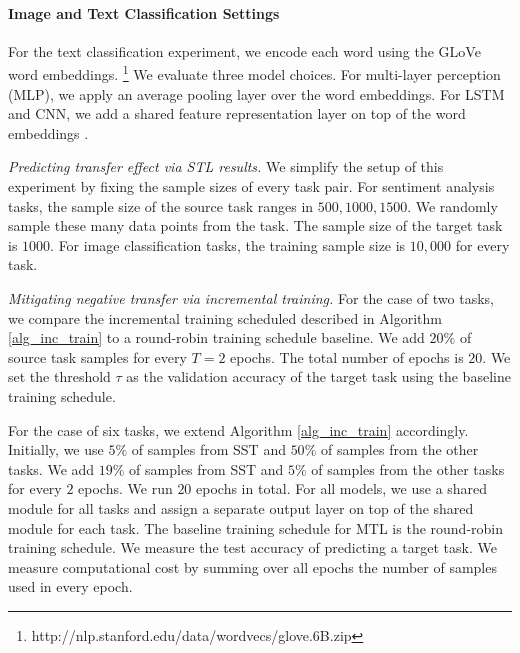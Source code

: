 \paragraph{Image and Text Classification Settings}\label{app_it}

For the text classification experiment, we encode each word using the GLoVe word embeddings.%
\footnote{http://nlp.stanford.edu/data/wordvecs/glove.6B.zip}
We evaluate three model choices.
For multi-layer perception (MLP), we apply an average pooling layer over the word embeddings.
For LSTM and CNN, we add a shared feature representation layer on top of the word embeddings \cite{lei2018simple}.

\textit{Predicting transfer effect via STL results.}
We simplify the setup of this experiment by fixing the sample sizes of every task pair.
For sentiment analysis tasks, the sample size of the source task ranges in $500, 1000, 1500$.
We randomly sample these many data points from the task.
The sample size of the target task is $1000$.
For image classification tasks, the training sample size is $10,000$ for every task.

\textit{Mitigating negative transfer via incremental training.}
For the case of two tasks, we compare the incremental training scheduled described in Algorithm \ref{alg_inc_train}  to a round-robin training schedule baseline.
We add $20\%$ of source task samples for every $T = 2$ epochs.
The total number of epochs is $20$.
We set the threshold $\tau$ as the validation accuracy of the target task using the baseline training schedule.

For the case of six tasks, we extend Algorithm \ref{alg_inc_train} accordingly.
Initially, we use $5\%$ of samples from SST and $50\%$ of samples from the other tasks.
We add $19\%$ of samples from SST and $5\%$ of samples from the other tasks for every $2$ epochs.
We run $20$ epochs in total.
For all models, we use a shared module for all tasks and assign a separate output layer on top of the shared module for each task.
The baseline training schedule for MTL is the round-robin training schedule.
We measure the test accuracy of predicting a target task.
We measure computational cost by summing over all epochs the number of samples used in every epoch.

